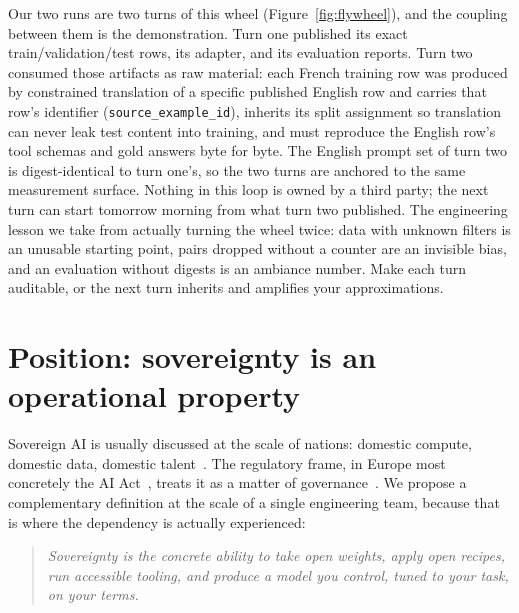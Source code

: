 \documentclass{article}
\begin{document}
Our two runs are two turns of this wheel (Figure~\ref{fig:flywheel}), and the coupling between them is the demonstration. Turn one published its exact train/validation/test rows, its adapter, and its evaluation reports. Turn two consumed those artifacts as raw material: each French training row was produced by constrained translation of a specific published English row and carries that row's identifier (\texttt{source\_example\_id}), inherits its split assignment so translation can never leak test content into training, and must reproduce the English row's tool schemas and gold answers byte for byte. The English prompt set of turn two is digest-identical to turn one's, so the two turns are anchored to the same measurement surface. Nothing in this loop is owned by a third party; the next turn can start tomorrow morning from what turn two published. The engineering lesson we take from actually turning the wheel twice: data with unknown filters is an unusable starting point, pairs dropped without a counter are an invisible bias, and an evaluation without digests is an ambiance number. Make each turn auditable, or the next turn inherits and amplifies your approximations.

\section{Position: sovereignty is an operational property}
\label{sec:sovereignty}

Sovereign AI is usually discussed at the scale of nations: domestic compute, domestic data, domestic talent~\citep{nvidia2024sovereignai,singh2025sovereignai}. The regulatory frame, in Europe most concretely the AI Act~\citep{europeanunion2024aiact}, treats it as a matter of governance~\citep{srivastava2024digitalsovereignty}. We propose a complementary definition at the scale of a single engineering team, because that is where the dependency is actually experienced:

\begin{quote}
\emph{Sovereignty is the concrete ability to take open weights, apply open recipes, run accessible tooling, and produce a model you control, tuned to your task, on your terms.}
\end{quote}
\end{document}

